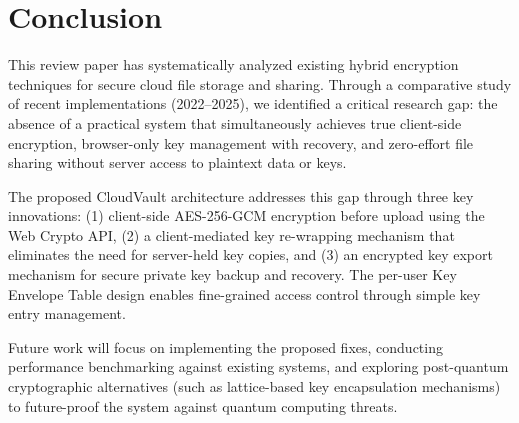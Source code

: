 \documentclass[conference]{IEEEtran}
\begin{document}
\section{Conclusion}

This review paper has systematically analyzed existing hybrid encryption techniques for secure cloud file storage and sharing. Through a comparative study of recent implementations (2022--2025), we identified a critical research gap: the absence of a practical system that simultaneously achieves true client-side encryption, browser-only key management with recovery, and zero-effort file sharing without server access to plaintext data or keys.

The proposed CloudVault architecture addresses this gap through three key innovations: (1) client-side AES-256-GCM encryption before upload using the Web Crypto API, (2) a client-mediated key re-wrapping mechanism that eliminates the need for server-held key copies, and (3) an encrypted key export mechanism for secure private key backup and recovery. The per-user Key Envelope Table design enables fine-grained access control through simple key entry management.

Future work will focus on implementing the proposed fixes, conducting performance benchmarking against existing systems, and exploring post-quantum cryptographic alternatives (such as lattice-based key encapsulation mechanisms) to future-proof the system against quantum computing threats.
\end{document}
